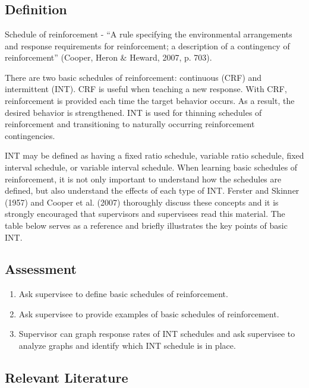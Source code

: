 \section[\fourdTwo{}]{\fourdTwo{}%
              }
\subsection{Definition}
Schedule of reinforcement - ``A rule specifying the environmental arrangements and response requirements for reinforcement; a description of a contingency of reinforcement'' (Cooper, Heron \& Heward, 2007, p. 703).

There are two basic schedules of reinforcement: continuous (CRF) and intermittent (INT). CRF is useful when teaching a new response. With CRF, reinforcement is provided each time the target behavior occurs. As a result, the desired behavior is strengthened. INT is used for thinning schedules of reinforcement and transitioning to naturally occurring reinforcement contingencies. 

INT may be defined as having a fixed ratio schedule, variable ratio schedule, fixed interval schedule, or variable interval schedule. When learning basic schedules of reinforcement, it is not only important to understand how the schedules are defined, but also understand the effects of each type of INT.  Ferster and Skinner (1957) and Cooper et al. (2007) thoroughly discuss these concepts and it is strongly encouraged that supervisors and supervisees read this material. The table below serves as a reference and briefly illustrates the key points of basic INT.
%
\subsection{Assessment}
\begin{enumerate}
\item Ask supervisee to define basic schedules of reinforcement.
\item Ask supervisee to provide examples of basic schedules of reinforcement.
\item Supervisor can graph response rates of INT schedules and ask supervisee to analyze graphs and identify which INT schedule is in place.
\end{enumerate}
%
\subsection{Relevant Literature}
\begin{refsection}
\nocite{test,alang2017police,clayton2018black}
\printbibliography[heading=none]
\end{refsection}
%
%
%
%
%
